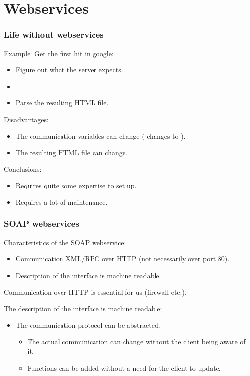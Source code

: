 \section{Webservices}
\begin{frame}
  \frametitle{Life without webservices}
  \pause

  Example: Get the first hit in google:
  \begin{itemize}
    \item Figure out what the server expects.
    \item {}
    \item Parse the resulting HTML file.
  \end{itemize}
  \bigskip
  \pause

  Disadvantages:
  \begin{itemize}
    \item The communication variables can change ( changes to
      ).
    \item The resulting HTML file can change.
  \end{itemize}
  \bigskip

  Conclusions:
  \begin{itemize}
    \item Requires quite some expertise to set up.
    \item Requires a lot of maintenance.
  \end{itemize}
\end{frame}

\begin{frame}
  \frametitle{SOAP webservices}

  Characteristics of the SOAP webservice:
  \begin{itemize}
    \item Communication XML/RPC over HTTP (not necessarily over port 80).
    \item Description of the interface is machine readable.
  \end{itemize}
  \bigskip

  Communication over HTTP is essential for us (firewall etc.).
  \bigskip
  \pause

  The description of the interface is machine readable:
  \begin{itemize}
    \item The communication protocol can be abstracted.
    \begin{itemize}
      \item The actual communication can change without the client being aware
        of it.
      \item Functions can be added without a need for the client to update.
    \end{itemize}
  \end{itemize}
\end{frame}


